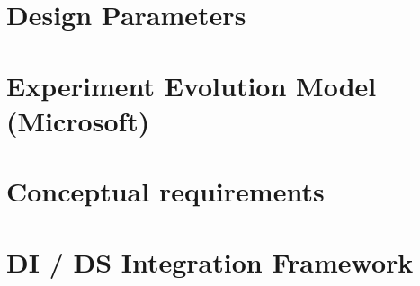     

\section{Design Parameters}
\section{Experiment Evolution Model (Microsoft)}
\section{Conceptual requirements}
\section{DI / DS Integration Framework}
